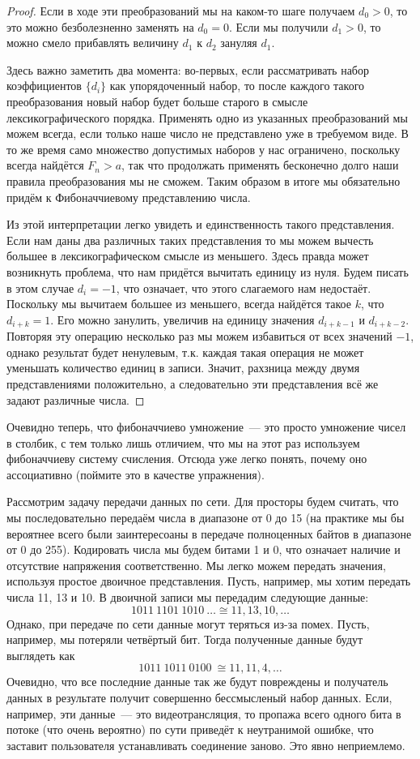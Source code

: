 \begin{proof}
Если в ходе эти преобразований мы на каком-то шаге получаем $d_0 > 0$, то это можно безболезненно заменять на $d_0 = 0$. Если мы получили $d_1 > 0$, то можно смело прибавлять величину $d_1$ к $d_2$ зануляя $d_1$.

Здесь важно заметить два момента: во-первых, если рассматривать набор коэффициентов $\{d_i\}$ как упорядоченный набор, то после каждого такого преобразования новый набор будет больше старого в смысле лексикографического порядка. Применять одно из указанных преобразований мы можем всегда, если только наше число не представлено уже в требуемом виде. В то же время само множество допустимых наборов у нас ограничено, поскольку всегда найдётся $F_n > a$, так что продолжать применять бесконечно долго наши правила преобразования мы не сможем. Таким образом в итоге мы обязательно придём к Фибоначчиевому представлению числа.

Из этой интерпретации легко увидеть и единственность такого представления. Если нам даны два различных таких представления то мы можем вычесть большее в лексикографическом смысле из меньшего. Здесь правда может возникнуть проблема, что нам придётся вычитать единицу из нуля. Будем писать в этом случае $d_i =-1$, что означает, что этого слагаемого нам недостаёт. Поскольку мы вычитаем большее из меньшего, всегда найдётся такое $k$, что $d_{i+k} = 1$. Его можно занулить, увеличив на единицу значения $d_{i+k - 1}$ и $d_{i+k-2}$. Повторяя эту операцию несколько раз мы можем избавиться от всех значений $-1$, однако результат будет ненулевым, т.к. каждая такая операция не может уменьшать количество единиц в записи. Значит, рахзница между двумя представлениями положительно, а следовательно эти представления всё же задают различные числа.
\end{proof}

Очевидно теперь, что фибоначчиево умножение~--- это просто умножение чисел в столбик, с тем только лишь отличием, что мы на этот раз используем фибоначчиеву систему счисления. Отсюда уже легко понять, почему оно ассоциативно (поймите это в качестве упражнения).

Рассмотрим задачу передачи данных по сети. Для просторы будем считать, что мы последовательно передаём числа в диапазоне от 0 до 15 (на практике мы бы вероятнее всего были заинтересоаны в передаче полноценных байтов в диапазоне от 0 до 255). Кодировать числа мы будем битами 1 и 0, что означает наличие и отсутствие напряжения соответственно. Мы легко можем передать значения, используя простое двоичное представления. Пусть, например, мы хотим передать числа 11, 13 и 10. В двоичной записи мы передадим следующие данные:
$$1011\ 1101\ 1010\ \ldots \cong 11,13,10,\ldots$$
Однако, при передаче по сети данные могут теряться из-за помех. Пусть, например, мы потеряли четвёртый бит. Тогда полученные данные будут выглядеть как
$$1011\ 1011\ 0100\ \cong 11, 11, 4, \ldots$$
Очевидно, что все последние данные так же будут повреждены и получатель данных в результате получит совершенно бессмысленый набор данных. Если, например, эти данные~--- это видеотрансляция, то пропажа всего одного бита в потоке (что очень вероятно) по сути приведёт к неутранимой ошибке, что заставит пользователя устанавливать соединение заново. Это явно неприемлемо.

